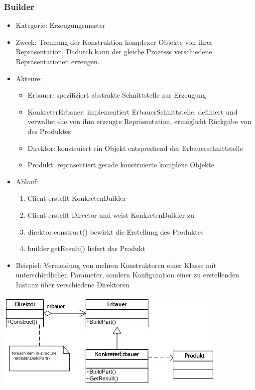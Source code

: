 \documentclass[11pt, fleqn, a4paper, leqno]{scrartcl} %
\begin{document}
		\subsubsection{Builder}
			\begin{itemize}
				\item Kategorie: Erzeugungsmuster
				\item Zweck: Trennung der Konstruktion komplexer Objekte von ihrer Repräsentation. Dadurch kann der gleiche Prozesss verschiedene Repräsentationen erzeugen.
				\item Akteure: 
					\begin{itemize}
						\item Erbauer: spezifiziert abstrakte Schnittstelle zur Erzeugung
						\item KonkreterErbauer: implementiert ErbauerSchnittstelle, definiert und verwaltet die von ihm erzeugte Repräsentation, ermöglicht Rückgabe von des Produktes
						\item Direktor: konstruiert ein Objekt entsprechend der Erbauerschnittstelle
						\item Produkt: repräsentiert gerade konstruierte komplexe Objekte
					\end{itemize}
				\item Ablauf:
					\begin{enumerate}
						\item Client erstellt KonkretenBuilder
						\item Client erstellt Director und weist KonkretenBuilder zu
						\item direktor.construct() bewirkt die Erstellung des Produktes
						\item builder.getResult() liefert das Produkt 
					\end{enumerate}
				\item Beispiel: Vermeidung von mehren Konstruktoren einer Klasse mit unterschiedlichen Parameter, sondern Konfiguration einer zu erstellenden Instanz über verschiedene Direktoren
			\end{itemize}
			\includegraphics{images/builder.jpg}
			\newpage
\end{document}
